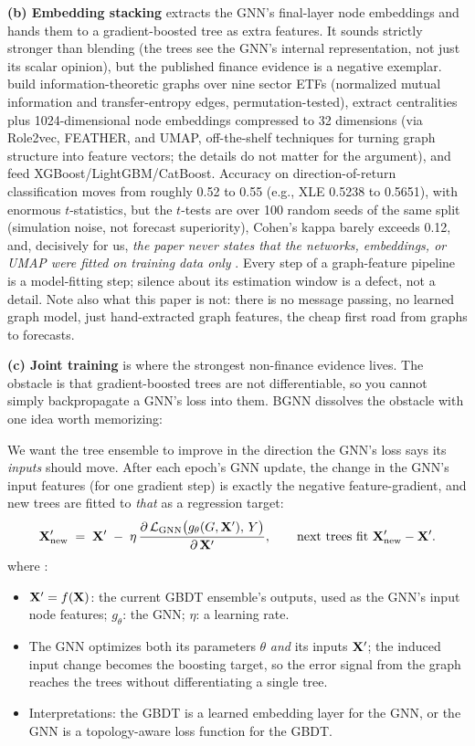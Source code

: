 \textbf{(b) Embedding stacking} extracts the GNN's final-layer node embeddings and hands them to a gradient-boosted tree as extra features. It sounds strictly stronger than blending (the trees see the GNN's internal representation, not just its scalar opinion), but the published finance evidence is a negative exemplar. \citet{ChoiKim2024} build information-theoretic graphs over nine sector ETFs (normalized mutual information and transfer-entropy edges, permutation-tested), extract centralities plus 1024-dimensional node embeddings compressed to 32 dimensions (via Role2vec, FEATHER, and UMAP, off-the-shelf techniques for turning graph structure into feature vectors; the details do not matter for the argument), and feed XGBoost/LightGBM/CatBoost. Accuracy on direction-of-return classification moves from roughly 0.52 to 0.55 (e.g., XLE 0.5238 to 0.5651), with enormous $t$-statistics, but the $t$-tests are over 100 random seeds of the same split (simulation noise, not forecast superiority), Cohen's kappa barely exceeds 0.12, and, decisively for us, \emph{the paper never states that the networks, embeddings, or UMAP were fitted on training data only} \citep[Table~8; \S3--4]{ChoiKim2024}. Every step of a graph-feature pipeline is a model-fitting step; silence about its estimation window is a defect, not a detail. Note also what this paper is not: there is no message passing, no learned graph model, just hand-extracted graph features, the cheap first road from graphs to forecasts.

\textbf{(c) Joint training} is where the strongest non-finance evidence lives. The obstacle is that gradient-boosted trees are not differentiable, so you cannot simply backpropagate a GNN's loss into them. BGNN \citep{IvanovProkhorenkova2021} dissolves the obstacle with one idea worth memorizing:

We want the tree ensemble to improve in the direction the GNN's loss says its \emph{inputs} should move. After each epoch's GNN update, the change in the GNN's input features (for one gradient step) is exactly the negative feature-gradient, and new trees are fitted to \emph{that} as a regression target:
\begin{equation}\label{eq:gnn:bgnn}
  \mathbf{X}'_{\text{new}} \;=\; \mathbf{X}' \;-\; \eta\, \frac{\partial\, \mathcal{L}_{\text{GNN}}\bigl(g_\theta(G, \mathbf{X}'),\, Y\bigr)}{\partial\, \mathbf{X}'},
  \qquad
  \text{next trees fit } \mathbf{X}'_{\text{new}} - \mathbf{X}'.
\end{equation}
where \citep[Alg.~1, \S3, pp.~3--4]{IvanovProkhorenkova2021}:
\begin{itemize}[nosep]
  \item $\mathbf{X}' = f(\mathbf{X})$: the current GBDT ensemble's outputs, used as the GNN's input node features; $g_\theta$: the GNN; $\eta$: a learning rate.
  \item The GNN optimizes both its parameters $\theta$ \emph{and} its inputs $\mathbf{X}'$; the induced input change becomes the boosting target, so the error signal from the graph reaches the trees without differentiating a single tree.
  \item Interpretations: the GBDT is a learned embedding layer for the GNN, or the GNN is a topology-aware loss function for the GBDT.
\end{itemize}

